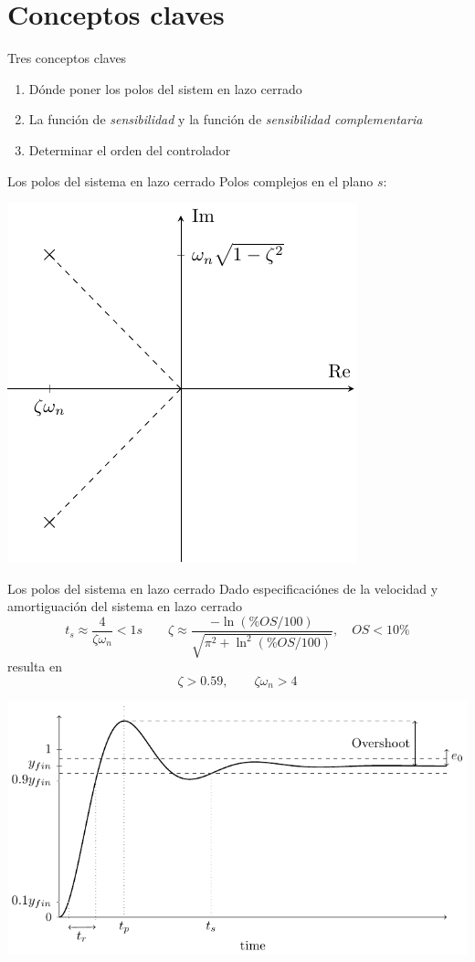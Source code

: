 \documentclass[presentation,aspectratio=169]{beamer}
\begin{document}
\section{Conceptos claves}
\label{sec:org773752f}
\begin{frame}[label={sec:orga06d059}]{Tres conceptos claves}
\begin{enumerate}
\item Dónde poner los polos del sistem en lazo cerrado
\item La función de \emph{sensibilidad} y la función de \emph{sensibilidad complementaria}
\item Determinar el orden del controlador
\end{enumerate}
\end{frame}

\begin{frame}[label={sec:orgdaa78cd}]{Los polos del sistema en lazo cerrado}
Polos complejos en el plano \(s\):
\begin{center}
\includegraphics[width=0.45\linewidth]{../../figures/implane-second-order-poles}
\end{center}
\end{frame}

\begin{frame}[label={sec:org45abf8b}]{Los polos del sistema en lazo cerrado}
Dado especificaciónes de la velocidad y amortiguación del sistema en lazo cerrado
\[ t_s \approx \frac{4}{\zeta\omega_n} < 1 s \qquad \zeta \approx \frac{-\ln (\%OS/100)}{\sqrt{\pi^2 + \ln^2(\%OS/100)}}, \quad OS < 10\%  \]
resulta en 
\[ \zeta > 0.59,  \qquad \zeta\omega_n > 4\]

\begin{center}
\includegraphics[width=0.6\linewidth]{../../figures/step-response-specifications}
\end{center}
\end{frame}
\end{document}
